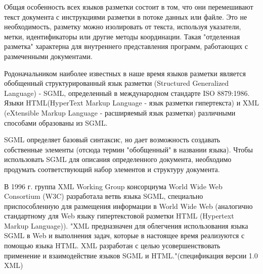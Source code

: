 \documentclass[12pt,a4paper,oneside]{article} %
\begin{document}
Общая особенность всех языков разметки состоит в том, что они \linebreak
перемешивают текст документа с инструкциями разметки в потоке \linebreak
данных или файле. Это не необходимость, разметку можно изолировать \linebreak
от текста, используя указатели, метки, идентификаторы или другие \linebreak
методы координации. Такая "отделенная разметка" характерна для \linebreak
внутреннего представления программ, работающих с размеченными \linebreak
документами.

Родоначальником наиболее известных в наше время языков разметки \linebreak
является обобщенный структурированный язык разметки (Structured \linebreak
Generalized Language) - SGML, определенный в международном стандарте \linebreak
ISO 8879:1986. Языки HTML(HyperText Markup Language - язык разметки \linebreak
гипертекста) и XML (eXtensible Markup Language - расширяемый язык \linebreak
разметки) различными способами образованы из SGML.

SGML определяет базовый синтаксис, но дает возможность создавать \linebreak
собственные элементы (отсюда термин "обобщенный" в названии языка).\linebreak
Чтобы использовать SGML для описания определенного документа, \linebreak
необходимо продумать соответствующий набор элементов и структуру \linebreak
документа.

В 1996 г. группа XML Working Group консорциума World Wide Web \linebreak
Consortium (W3C) разработала ветвь языка SGML, специально \linebreak
приспособленную для размещения информации в World Wide Web \linebreak
(аналогично стандартному для Web языку гипертекстовой разметки HTML\linebreak
(Hypertext Markup Language)). "XML предназначен для облегчения \linebreak
использования языка SGML в Web и выполнения задач, которые в \linebreak
настоящее время реализуются с помощью языка HTML. XML разработан \linebreak
с целью усовершенствовать применение и взаимодействие языков \linebreak
SGML и HTML."(спецификация версии 1.0 XML)
\end{document}
